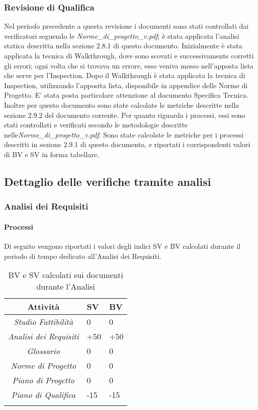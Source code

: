 \subsubsection{Revisione di Qualifica}
Nel periodo precedente a questa revisione i documenti sono stati controllati dai verificatori seguendo le \emph{Norme\_di\_progetto\_v\versioneNormeDiProgetto{}.pdf}; è stata applicata l'analisi statica descritta nella sezione 2.8.1 di questo documento. Inizialmente è stata applicata la tecnica di Walkthrough, dove sono scovati e successivamente corretti gli errori; ogni volta che si trovava un errore, esso veniva messo nell'apposta lista che serve per l'Inspection. Dopo il Walkthrough è stata applicata la tecnica di Inspection, utilizzando l'apposita lista, disponibile in appendice delle Norme di Progetto. E' stata posta particolare attenzione al documento Specifica Tecnica. Inoltre per questo documento sono state calcolate le metriche descritte nella sezione 2.9.2 del documento corrente. Per quanto riguarda i processi, essi sono stati controllati e verificati secondo le metodologie descritte nelle\emph{Norme\_di\_progetto\_v\versioneNormeDiProgetto{}.pdf}. Sono state calcolate le metriche per i processi descritti in
sezione 2.9.1 di questo documento, e riportati i corrispondenti valori di BV e SV in forma tabellare.

\subsection{Dettaglio delle verifiche tramite analisi}
\subsubsection{Analisi dei Requisiti}
\paragraph{Processi}
Di seguito vengono riportati i valori degli indici SV e BV calcolati durante il periodo di tempo dedicato all'Analisi dei Requisiti.
\begin{longtable}{|c|p{3cm}|p{3cm}|}
\toprule
\textbf{Attività} & \textbf{SV} & \textbf{BV} \\


\midrule
\emph{Studio Fattibilità} & 0 & 0 \\
\midrule
\emph{Analisi dei Requisiti} & +50 & +50\\
\midrule
\emph{Glossario} & 0  & 0\\
\midrule
\emph{Norme di Progetto} & 0 & 0\\
\midrule
\emph{Piano di Progetto} & 0 & 0\\
\midrule
\emph{Piano di Qualifica} & -15 & -15\\
\bottomrule
\caption{BV e SV calcolati sui documenti durante l'Analisi}
\label{tab:changelog}
\end{longtable}


